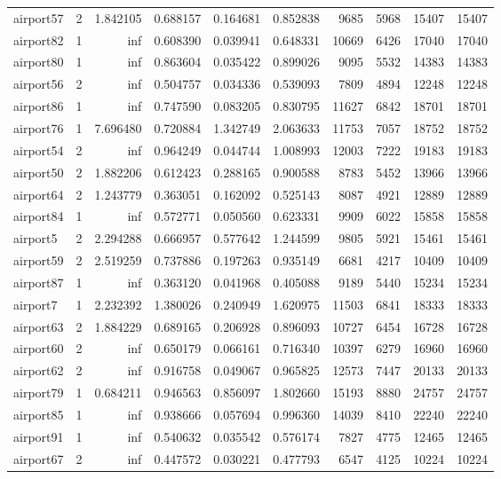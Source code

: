 \begin{longtable}{|l|r|r|r|r|r|r|r|r|r|}
airport57 & 2 & 1.842105 & 0.688157 & 0.164681 & 0.852838 & 9685 & 5968 & 15407 & 15407 \\
airport82 & 1 & inf & 0.608390 & 0.039941 & 0.648331 & 10669 & 6426 & 17040 & 17040 \\
airport80 & 1 & inf & 0.863604 & 0.035422 & 0.899026 & 9095 & 5532 & 14383 & 14383 \\
airport56 & 2 & inf & 0.504757 & 0.034336 & 0.539093 & 7809 & 4894 & 12248 & 12248 \\
airport86 & 1 & inf & 0.747590 & 0.083205 & 0.830795 & 11627 & 6842 & 18701 & 18701 \\
airport76 & 1 & 7.696480 & 0.720884 & 1.342749 & 2.063633 & 11753 & 7057 & 18752 & 18752 \\
airport54 & 2 & inf & 0.964249 & 0.044744 & 1.008993 & 12003 & 7222 & 19183 & 19183 \\
airport50 & 2 & 1.882206 & 0.612423 & 0.288165 & 0.900588 & 8783 & 5452 & 13966 & 13966 \\
airport64 & 2 & 1.243779 & 0.363051 & 0.162092 & 0.525143 & 8087 & 4921 & 12889 & 12889 \\
airport84 & 1 & inf & 0.572771 & 0.050560 & 0.623331 & 9909 & 6022 & 15858 & 15858 \\
airport5 & 2 & 2.294288 & 0.666957 & 0.577642 & 1.244599 & 9805 & 5921 & 15461 & 15461 \\
airport59 & 2 & 2.519259 & 0.737886 & 0.197263 & 0.935149 & 6681 & 4217 & 10409 & 10409 \\
airport87 & 1 & inf & 0.363120 & 0.041968 & 0.405088 & 9189 & 5440 & 15234 & 15234 \\
airport7 & 1 & 2.232392 & 1.380026 & 0.240949 & 1.620975 & 11503 & 6841 & 18333 & 18333 \\
airport63 & 2 & 1.884229 & 0.689165 & 0.206928 & 0.896093 & 10727 & 6454 & 16728 & 16728 \\
airport60 & 2 & inf & 0.650179 & 0.066161 & 0.716340 & 10397 & 6279 & 16960 & 16960 \\
airport62 & 2 & inf & 0.916758 & 0.049067 & 0.965825 & 12573 & 7447 & 20133 & 20133 \\
airport79 & 1 & 0.684211 & 0.946563 & 0.856097 & 1.802660 & 15193 & 8880 & 24757 & 24757 \\
airport85 & 1 & inf & 0.938666 & 0.057694 & 0.996360 & 14039 & 8410 & 22240 & 22240 \\
airport91 & 1 & inf & 0.540632 & 0.035542 & 0.576174 & 7827 & 4775 & 12465 & 12465 \\
airport67 & 2 & inf & 0.447572 & 0.030221 & 0.477793 & 6547 & 4125 & 10224 & 10224 \\

\end{longtable}

